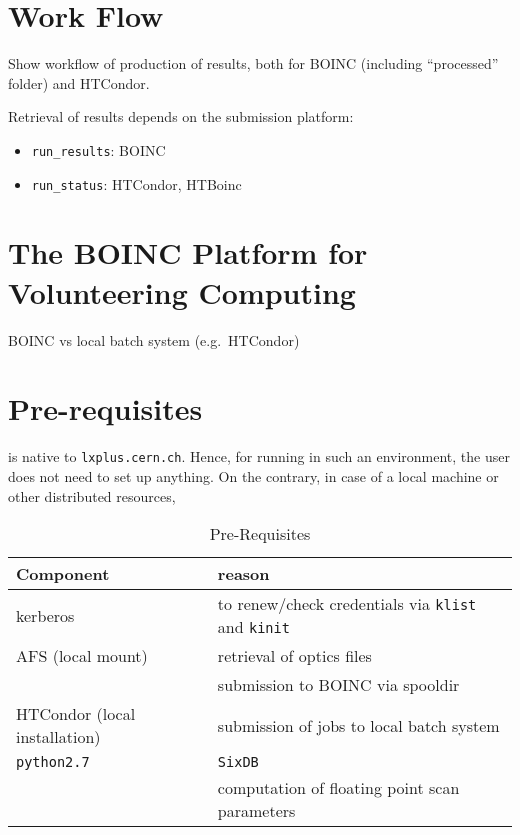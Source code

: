 \section{Work Flow}
Show workflow of production of results, both for BOINC (including ``processed''
folder) and HTCondor.

Retrieval of results depends on the submission platform:
\begin{itemize}
\item \texttt{run\_results}: BOINC
\item \texttt{run\_status}: HTCondor, HTBoinc
\end{itemize}

\section{The BOINC Platform for Volunteering Computing}
BOINC vs local batch system (e.g.~HTCondor)

\section{Pre-requisites}
\SIXDESK{} is native to \texttt{lxplus.cern.ch}. Hence, for running in such
an environment, the user does not need to set up anything. On the contrary,
in case of a local machine or other distributed resources,

\begin{table}[h]
\begin{center}
    \caption{Pre-Requisites}
    \label{tab:Pre-Requisites}
    \begin{tabular}{|l|l|}
    \hline
    \rowcolor{blue!30}
    \textbf{Component} & \textbf{reason} \\
    \hline
    kerberos & to renew/check credentials via \texttt{klist} and \texttt{kinit} \\
    \hline
    AFS (local mount) & retrieval of optics files \\
    & submission to BOINC via spooldir\\
    \hline
    HTCondor (local installation) & submission of jobs to local batch system \\
    \hline
    \texttt{python2.7} & \texttt{SixDB} \\
    & computation of floating point scan parameters \\
    \hline
    \end{tabular}
\end{center}
\end{table}
